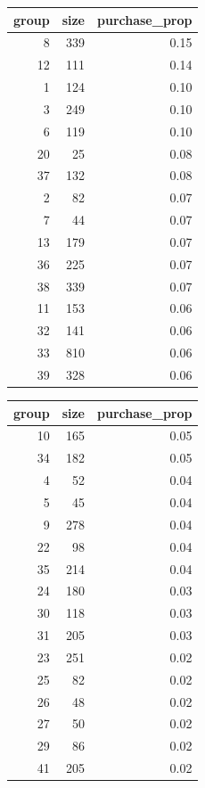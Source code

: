 \documentclass[
  12pt,
  oneside]{report}
\begin{document}
\begin{table}[H]

\centering
\begin{tabular}[t]{r|r|r}
\hline
group & size & purchase\_prop\\
\hline
8 & 339 & 0.15\\
\hline
12 & 111 & 0.14\\
\hline
1 & 124 & 0.10\\
\hline
3 & 249 & 0.10\\
\hline
6 & 119 & 0.10\\
\hline
20 & 25 & 0.08\\
\hline
37 & 132 & 0.08\\
\hline
2 & 82 & 0.07\\
\hline
7 & 44 & 0.07\\
\hline
13 & 179 & 0.07\\
\hline
36 & 225 & 0.07\\
\hline
38 & 339 & 0.07\\
\hline
11 & 153 & 0.06\\
\hline
32 & 141 & 0.06\\
\hline
33 & 810 & 0.06\\
\hline
39 & 328 & 0.06\\
\hline
\end{tabular}
\centering
\begin{tabular}[t]{r|r|r}
\hline
group & size & purchase\_prop\\
\hline
10 & 165 & 0.05\\
\hline
34 & 182 & 0.05\\
\hline
4 & 52 & 0.04\\
\hline
5 & 45 & 0.04\\
\hline
9 & 278 & 0.04\\
\hline
22 & 98 & 0.04\\
\hline
35 & 214 & 0.04\\
\hline
24 & 180 & 0.03\\
\hline
30 & 118 & 0.03\\
\hline
31 & 205 & 0.03\\
\hline
23 & 251 & 0.02\\
\hline
25 & 82 & 0.02\\
\hline
26 & 48 & 0.02\\
\hline
27 & 50 & 0.02\\
\hline
29 & 86 & 0.02\\
\hline
41 & 205 & 0.02\\
\hline
\end{tabular}
\end{table}
\end{document}
